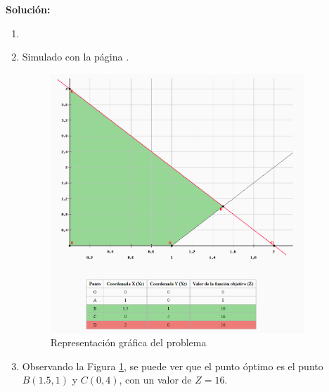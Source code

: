 \documentclass[../main.tex]{subfiles}
\begin{document}
\begin{exercise}
            \textbf{Solución:}
            \begin{enumerate}[label=\alph*)]
                \item
                \item Simulado con la página \cite{PL_online}.
                    \begin{figure}[ht]
                        \centering
                        \includegraphics[width=0.9\textwidth]{./images/guia/1-6_ejercicio.png}
                        \caption{Representación gráfica del problema}
                        \label{fig:1-6_ejercicio}
                    \end{figure}
                    
                \item Observando la Figura \ref{fig:1-6_ejercicio}, se puede ver que el punto óptimo es el punto $B(1.5,1)$ y $C(0,4)$, con un valor de $Z = 16$.
            \end{enumerate}
            \item 

        \end{exercise}
    
\end{document}
